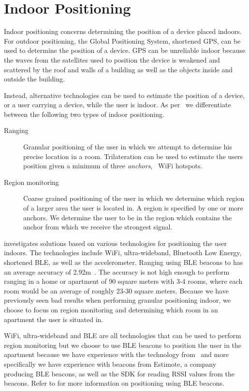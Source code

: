 \section{Indoor Positioning}
\label{sec:analysis:indoor-positioning}

Indoor positioning concerns determining the position of a device placed indoors. For outdoor positioning, the Global Positioning System, shortened GPS, can be used to determine the position of a device. GPS can be unreliable indoor because the waves from the satellites used to position the device is weakened and scattered by the roof and walls of a building as well as the objects inside and outside the building.

Instead, alternative technologies can be used to estimate the position of a device, or a user carrying a device, while the user is indoor. As per~\cite{prespecialisation} we differentiate between the following two types of indoor positioning.

\begin{description}
\item[Ranging] Granular positioning of the user in which we attempt to determine his precise location in a room. Trilateration can be used to estimate the users position given a minimum of three \emph{anchors}, \eg~WiFi hotspots.
\item[Region monitoring] Coarse grained positioning of the user in which we determine which region of a larger area the user is located in. A region is specified by one or more anchors. We determine the user to be in the region which contains the anchor from which we receive the strongest signal.
\end{description}

\cite{prespecialisation} investigates solutions based on various technologies for positioning the user indoors. The technologies include WiFi, ultra-wideband, Bluetooth Low Energy, shortened BLE, as well as the accelerometer. Ranging using BLE beacons to has an average accuracy of 2.92m~\cite[p. 63]{prespecialisation}. The accuracy is not high enough to perform ranging in a home or apartment of 90 square meters with 3-4 rooms, where each room would be an average of roughly 23-30 square meters. Because we have previously seen bad results when performing granular positioning indoor, we choose to focus on region monitoring and determining which room in an apartment the user is situated in.

WiFi, ultra-wideband and BLE are all technologies that can be used to perform region monitoring but we choose to use BLE beacons to position the user in the apartment because we have experience with the technology from~\cite{prespecialisation} and more specifically we have experience with beacons from Estimote, a company producing BLE beacons, as well as the SDK for reading RSSI values from the beacons. Refer to  for more information on positioning using BLE beacons.

